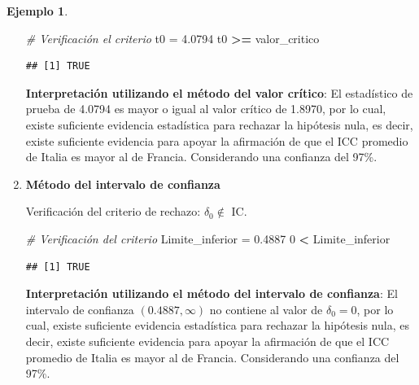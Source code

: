 \documentclass[
  11pt,
]{book}
\newenvironment{Shaded}{\begin{snugshade}}{\end{snugshade}}
\newcommand{\CommentTok}[1]{\textcolor[rgb]{0.56,0.35,0.01}{\textit{#1}}}
\newcommand{\DecValTok}[1]{\textcolor[rgb]{0.00,0.00,0.81}{#1}}
\newcommand{\FloatTok}[1]{\textcolor[rgb]{0.00,0.00,0.81}{#1}}
\newcommand{\NormalTok}[1]{#1}
\newcommand{\OtherTok}[1]{\textcolor[rgb]{0.56,0.35,0.01}{#1}}
\newcommand{\SpecialCharTok}[1]{\textcolor[rgb]{0.81,0.36,0.00}{\textbf{#1}}}
\theoremstyle{definition}
\theoremstyle{definition}
\newtheorem{example}{Ejemplo}[chapter]
\theoremstyle{definition}
\theoremstyle{definition}
\theoremstyle{remark}
\begin{document}
\begin{example}
\begin{enumerate}
\begin{Shaded}
\begin{Highlighting}[]
\CommentTok{\# Verificación el criterio}
\NormalTok{t0 }\OtherTok{=} \FloatTok{4.0794}
\NormalTok{t0 }\SpecialCharTok{\textgreater{}=}\NormalTok{ valor\_critico}
\end{Highlighting}
\end{Shaded}

\begin{verbatim}
## [1] TRUE
\end{verbatim}

  \textbf{Interpretación utilizando el método del valor crítico}: El estadístico de prueba de 4.0794 es mayor o igual al valor crítico de 1.8970, por lo cual, existe suficiente evidencia estadística para rechazar la hipótesis nula, es decir, existe suficiente evidencia para apoyar la afirmación de que el ICC promedio de Italia es mayor al de Francia. Considerando una confianza del 97\%.
\item
  \textbf{Método del intervalo de confianza}

  Verificación del criterio de rechazo: \(\delta_0 \notin\) IC.

\begin{Shaded}
\begin{Highlighting}[]
\CommentTok{\# Verificación del criterio}
\NormalTok{Limite\_inferior }\OtherTok{=} \FloatTok{0.4887}
\DecValTok{0} \SpecialCharTok{\textless{}}\NormalTok{ Limite\_inferior}
\end{Highlighting}
\end{Shaded}

\begin{verbatim}
## [1] TRUE
\end{verbatim}

  \textbf{Interpretación utilizando el método del intervalo de confianza}: El intervalo de confianza \((0.4887,\infty)\) no contiene al valor de \(\delta_0 = 0\), por lo cual, existe suficiente evidencia estadística para rechazar la hipótesis nula, es decir, existe suficiente evidencia para apoyar la afirmación de que el ICC promedio de Italia es mayor al de Francia. Considerando una confianza del 97\%.
\end{enumerate}

\end{example}
\end{document}
